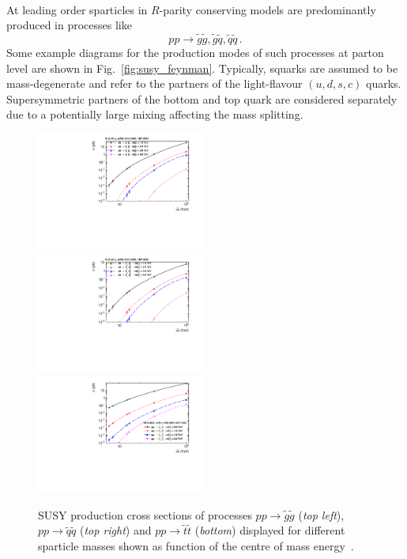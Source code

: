 \\
At leading order sparticles in $R$-parity conserving models are predominantly produced in processes like~\cite{Kane:1982hw, Harrison:1982yi, Reya:1984yz, Dawson:1983fw, Baer:1985xz}
\begin{equation}
 pp \rightarrow \tilde{g}\tilde{g}, \tilde{g}\tilde{q}, \tilde{q}\tilde{q} \, .
\end{equation}
Some example diagrams for the production modes of such processes at parton level are shown in Fig.~\ref{fig:susy_feynman}. Typically, squarks are assumed to be mass-degenerate and refer to the partners of the light-flavour $(u, d, s, c)$ quarks. Supersymmetric partners of the bottom and top quark are considered separately due to a potentially large mixing affecting the mass splitting.
\begin{figure}[!t]
  \centering
  \begin{minipage}[c]{1.\textwidth}
    \begin{center}
      \includegraphics[width=0.495\textwidth]{figures/gluino_xsec.pdf}  
      \includegraphics[width=0.495\textwidth]{figures/squark_xsec.pdf} \\
      \includegraphics[width=0.495\textwidth]{figures/stop_xsec.pdf}
    \end{center}
  \end{minipage}
  \caption{SUSY production cross sections of processes $pp \rightarrow \tilde{g}\tilde{g}$ (\textit{top left}), $pp \rightarrow \tilde{q}\tilde{q}$ (\textit{top right}) and $pp \rightarrow \tilde{t}\tilde{t}$ (\textit{bottom}) displayed for different sparticle masses shown as function of the centre of mass energy~\cite{Kramer:2012bx, Borschensky:2014cia}.}
  \label{fig:susy_cross_sec}
\end{figure}
